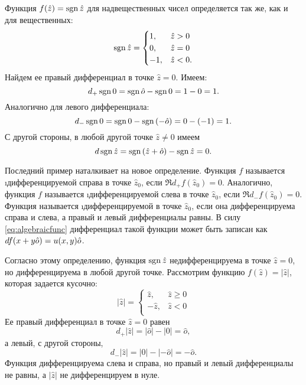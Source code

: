 \begin{example} 
	Функция $f(\hat{z})=\operatorname{sgn}{\hat{z}}$ для надвещественных чисел определяется так же, как и для вещественных:
		\begin{equation*}
			\operatorname{sgn}{\hat{z}} = \begin{cases}
				1, & \hat{z}>0 \\
				0, & \hat{z}=0 \\
				-1, & \hat{z}<0.
			\end{cases}
		\end{equation*}
	Найдем ее правый дифференциал в точке $\hat{z}=0$. Имеем:
		$$d_{+}\operatorname{sgn}{0}=\operatorname{sgn}{\hat{o}}-\operatorname{sgn}{0}=1-0=1.$$
	Аналогично для левого дифференциала:
		$$d_{-}\operatorname{sgn}{0}=\operatorname{sgn}{0}-\operatorname{sgn}{(-\hat{o})}=0-(-1)=1.$$
	С другой стороны, в любой другой точке $\hat{z}\neq 0$ имеем
		$$d\operatorname{sgn}{\hat{z}}=\operatorname{sgn}{(\hat{z}+\hat{o})}-\operatorname{sgn}{\hat{z}}=0.$$
\end{example}
Последний пример наталкивает на новое определение. Функция $f$ называется \i{дифференцируемой справа в точке $\hat{z}_0$}, если $\Re{d_{+}f(\hat{z}_0)}=0$. Аналогично, функция $f$ называется \i{дифференцируемой слева в точке $\hat{z}_0$}, если $\Re{d_{-}f(\hat{z}_0)}=0$. Функция называется \i{дифференцируемой в точке $\hat{z}_0$}, если она дифференцируема справа и слева, а правый и левый дифференциалы равны. В силу \eqref{eq:algebraicfunc} дифференциал такой функции может быть записан как~$df(x+y\hat{o})\hm=u(x, y)\hat{o}$.
\begin{example}
	Согласно этому определению, функция $\operatorname{sgn}{\hat{z}}$ недифференцируема в точке $\hat{z}=0$, но дифференцируема в любой другой точке. Рассмотрим функцию $f(\hat{z})=|\hat{z}|$, которая задается кусочно:
		\begin{equation*}
			|\hat{z}| = \begin{cases}
				\hat{z}, & \hat{z}\ge 0 \\
				-\hat{z}, & \hat{z}<0 \\
			\end{cases}
		\end{equation*}
	Ее правый дифференциал в точке $\hat{z}=0$ равен
		$$d_{+}|\hat{z}|=|\hat{o}|-|0|=\hat{o},$$
	а левый, с другой стороны,
		$$d_{-}|\hat{z}|=|0|-|-\hat{o}|=-\hat{o}.$$
	Функция дифференцируема слева и справа, но правый и левый дифференциалы не равны, а $|\hat{z}|$ не дифференцируем в нуле.
\end{example}

